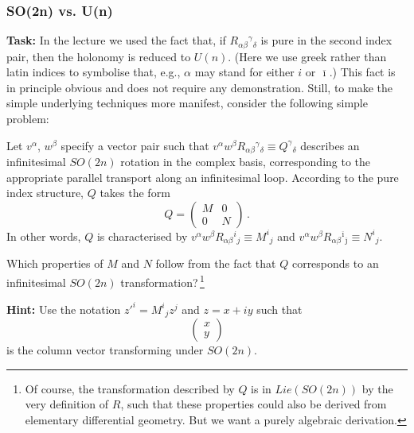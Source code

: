\documentclass[12pt]{article}
\newcommand{\be}{\begin{equation}}
\newcommand{\ee}{\end{equation}}
\newcommand{\ol}{\overline}
\numberwithin{equation}{section}
\begin{document}
\subsubsection{SO(2n) vs. U(n)}

{\bf Task:} In the lecture we used the fact that, if $R_{\alpha\beta}{}^\gamma{}_\delta$ is pure in the second index pair, then the holonomy is reduced to $U(n)$. (Here we use greek rather than latin indices to symbolise that, e.g., $\alpha$ may stand for either $i$ or $\ol{\imath}$.) This fact is in principle obvious and does not require any demonstration. Still, to make the simple underlying techniques more manifest, consider the following simple problem:

Let $v^\alpha$, $w^\beta$ specify a vector pair such that 
$v^\alpha w^\beta R_{\alpha\beta}{}^\gamma{}_\delta\equiv Q^\gamma{}_\delta$ describes an infinitesimal $SO(2n)$ rotation in the complex basis, corresponding to the appropriate parallel transport along an infinitesimal loop. According to the pure index structure, $Q$ takes the form 
\be
Q=\left(\begin{array}{cc} M & 0 \\ 0 & N
\end{array}\right)\,.
\ee
In other words, $Q$ is characterised by $v^\alpha w^\beta R_{\alpha\beta}{}^i{}_j\equiv M^i{}_j$ and 
$v^\alpha w^\beta R_{\alpha\beta}{}^{\ol{\imath}}{}_{\ol{\jmath}}\equiv N^i{}_j$.

Which properties of $M$ and $N$ follow from the fact that $Q$ corresponds to an infinitesimal $SO(2n)$ transformation?$\,$\footnote{Of course, the transformation described by $Q$ is in $Lie(SO(2n))$ by the very definition of $R$, such that these properties could also be derived from elementary differential geometry. But we want a purely algebraic derivation.}

\noindent
{\bf Hint:} Use the notation $z'^i=M^i{}_jz^j$ and $z=x+iy$ such that
\be
\left(\begin{array}{c} x \\ y\end{array}\right) 
\ee
is the column vector transforming under $SO(2n)$. 
\end{document}
